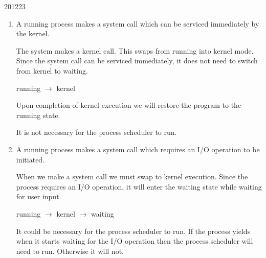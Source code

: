 \documentclass[10pt,\jkfside,a4paper]{article}
\begin{document}
\begin{examquestion}{2012}{2}{3}
\begin{enumerate}
\begin{enumerate}
\item A running process makes a system call which can be serviced immediately
by the kernel.

The system makes a kernel call. This swaps from running into kernel mode. Since the 
system call can be serviced immediately, it does not need to switch from kernel to 
waiting.

running $\longrightarrow$ kernel

Upon completion of kernel execution we will restore the program to the running state.

It is not necessary for the process scheduler to run.

\item A running process makes a system call which requires an I/O operation to
be initiated.

When we make a system call we must swap to kernel execution. Since the process requires an I/O 
operation, it will enter the waiting state while waiting for user input.

running $\longrightarrow$ kernel $\longrightarrow$ waiting

It could be necessary for the process scheduler to run. If the process yields when 
it starts waiting for the I/O operation then the process scheduler will need to run. 
Otherwise it will not.

\end{enumerate}

\end{enumerate}

\end{examquestion}
\end{document}
